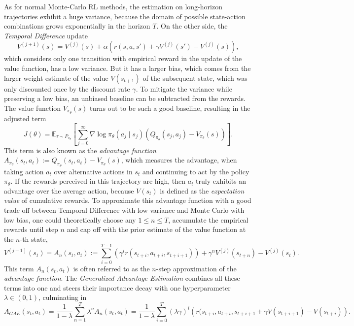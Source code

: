 \documentclass[a4paper, 11pt]{article}
\begin{document}
	As for normal Monte-Carlo RL methods, the estimation on long-horizon trajectories exhibit a huge variance, because the domain of possible state-action combinations grows exponentially in the horizon $T$.
	On the other side, the \textit{Temporal Difference} update 
	\[V^{(j+1)}(s)=V^{(j)}(s)+\alpha \left(r(s,a,s')+\gamma V^{(j)}(s')-V^{(j)}(s)\right),\]
	which considers only one transition with empirical reward in the update of the value function, has a low variance. But it has a larger bias, which comes from the larger weight estimate of the value $V(s_{t+1})$ of the subsequent state, which was only discounted once by the discount rate $\gamma$. 
	To mitigate the variance while preserving a low bias, an unbiased baseline can be subtracted from the rewards. The value function $V_{\pi_{\theta}}(s)$ turns out to be such a good baseline, resulting in the adjusted term 
	\[J(\theta)=\mathbb{E}_{\tau\sim P_{\pi_{\theta}}}\left[\sum_{j=0}^{\infty}\nabla\log\pi_\theta(a_j\mid s_j) \left(Q_{\pi_{\theta}}(s_j,a_j)-V_{\pi_{\theta}}(s)\right)\right].\]
	This term is also known as the \textit{advantage function} $A_{\pi_{\theta}}(s_t,a_t):=Q_{\pi_{\theta}}(s_t,a_t)-V_{\pi_{\theta}}(s)$, which measures the advantage, when taking action $a_t$ over alternative actions in $s_t$ and continuing to act by the policy $\pi_{\theta}$. If the rewards perceived in this trajectory are high, then $a_t$ truly exhibits an advantage over the average action, because $V(s_t)$ is defined as the \textit{expectation value} of cumulative rewards.
	To approximate this advantage function with a good trade-off between Temporal Difference with low variance and Monte Carlo with low bias, one could theoretically choose any $1\leq n \leq T$, accumulate the empirical rewards until step $n$ and cap off with the prior estimate of the value function at the $n$-th state,
	\[V^{(j+1)}(s_t)=A_n(s_t,a_t):=\sum_{i=0}^{T-1}\left(\gamma^i r(s_{t+i},a_{t+i},s_{t+i+1})\right) +\gamma^n V^{(j)}(s_{t+n})-V^{(j)}(s_t).\]
	\label{sec:gae}
	This term $A_n(s_t,a_t)$ is often referred to as the $n$-step approximation of the \textit{advantage function}.
	The \textit{Generalized Advantage Estimation} combines all these terms into one and steers their importance decay with one hyperparameter $\lambda\in(0,1)$, culminating in
	\[A_{GAE}(s_t,a_t)=\frac{1}{1-\lambda}\sum_{n=1}^{T}\lambda^n A_n(s_t,a_t)=\frac{1}{1-\lambda}\sum_{i=0}^{T}(\lambda\gamma)^i\left( r(s_{t+i},a_{t+i},s_{t+i+1}+\gamma V(s_{t+i+1})-V(s_{t+i})\right).\]
	
\end{document}
